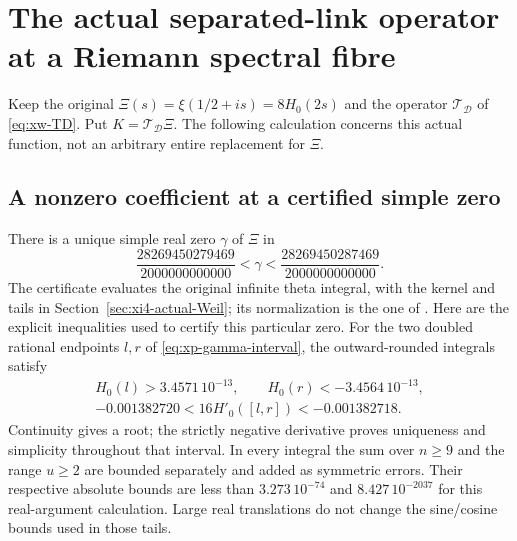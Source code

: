 \section{The actual separated-link operator at a Riemann spectral fibre}
\label{sec:xi4-trace-pole}

Keep the original $\Xi(s)=\xi(1/2+is)=8H_0(2s)$ and the operator
$\mathcal T_{\mathcal D}$ of \eqref{eq:xw-TD}. Put
$K=\mathcal T_{\mathcal D}\Xi$. The following calculation concerns
this actual function, not an arbitrary entire replacement for $\Xi$.

\subsection{A nonzero coefficient at a certified simple zero}

There is a unique simple real zero $\gamma$ of $\Xi$ in
\begin{equation}\label{eq:xp-gamma-interval}
 \frac{28269450279469}{2000000000000}<\gamma<
 \frac{28269450287469}{2000000000000}.
\end{equation}
The certificate evaluates the original infinite theta integral,
with the kernel and tails in Section~\ref{sec:xi4-actual-Weil};
its normalization is the one of \cite{rodgersTao2020,polymath2019}.
Here are the explicit inequalities used to certify this particular zero.
For the two doubled rational endpoints $l,r$ of
\eqref{eq:xp-gamma-interval}, the outward-rounded integrals satisfy
\[
 \begin{gathered}
 H_0(l)>3.4571\,10^{-13},\qquad H_0(r)<-3.4564\,10^{-13},\\
 -0.001382720<16H'_0([l,r])<-0.001382718.
 \end{gathered}
\]
Continuity gives a root; the strictly negative derivative proves
uniqueness and simplicity throughout that interval. In every integral
the sum over $n\geq9$ and the range $u\geq2$ are bounded separately
and added as symmetric errors. Their respective absolute bounds are
less than $3.273\,10^{-74}$ and $8.427\,10^{-2037}$ for this
real-argument calculation. Large real translations do not change
the sine/cosine bounds used in those tails.

